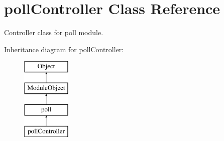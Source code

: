 \hypertarget{classpollController}{}\section{poll\+Controller Class Reference}
\label{classpollController}


Controller class for poll module.  


Inheritance diagram for poll\+Controller\+:\begin{figure}[H]
\begin{center}
\leavevmode
\includegraphics[height=4.000000cm]{classpollController}
\end{center}
\end{figure}
